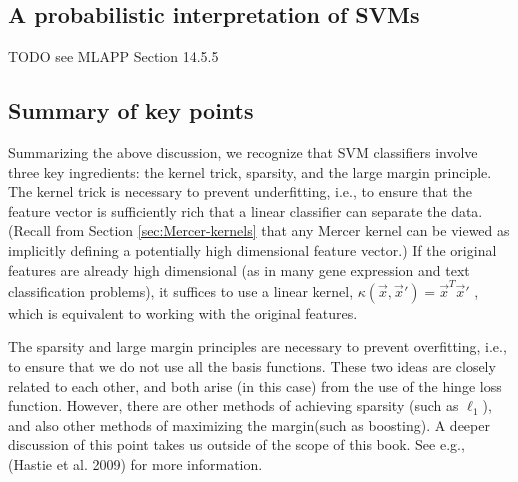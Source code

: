 \subsection{A probabilistic interpretation of SVMs}
TODO see MLAPP Section 14.5.5


\subsection{Summary of key points}
Summarizing the above discussion, we recognize that SVM classifiers involve three key ingredients: the kernel trick, sparsity, and the large margin principle. The kernel trick is necessary to prevent underfitting, i.e., to ensure that the feature vector is sufficiently rich that a linear classifier can separate the data. (Recall from Section \ref{sec:Mercer-kernels} that any Mercer kernel can be viewed as implicitly defining a potentially high dimensional feature vector.) If the original features are already high dimensional (as in many gene expression and text classification problems), it suffices to use a linear kernel, $\kappa(\vec{x},\vec{x}')=\vec{x}^T\vec{x}'$ , which is equivalent to working with the original features.

The sparsity and large margin principles are necessary to prevent overfitting, i.e., to ensure that we do not use all the basis functions. These two ideas are closely related to each other, and both arise (in this case) from the use of the hinge loss function. However, there are other methods of achieving sparsity (such as $\ell_1$), and also other methods of maximizing the margin(such as boosting). A deeper discussion of this point takes us outside of the scope of this book. See e.g., (Hastie et al. 2009) for more information.


